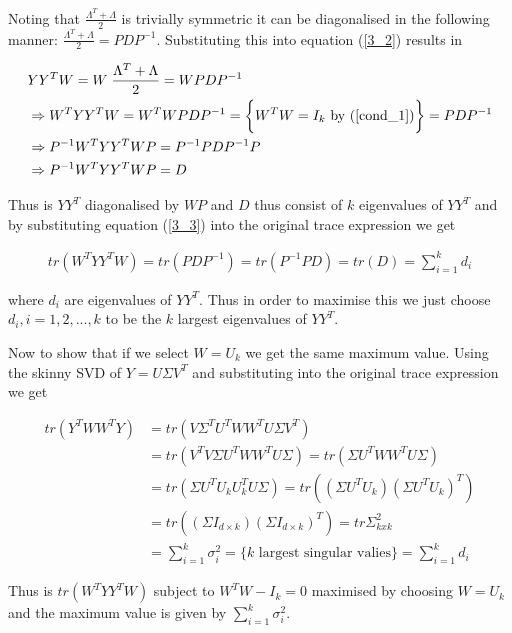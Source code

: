 Noting that $\frac{\Lambda^T + \Lambda}{2}$ is trivially symmetric it can be diagonalised in the following manner: $\frac{\Lambda^T + \Lambda}{2} = PDP^{-1}$. Substituting this into equation (\ref{3_2}) results in

\begin{align}
  & Y Y^T W = W \; \frac{\Lambda^T + \Lambda}{2} = W PDP^{-1} \\
  & \Rightarrow  W^T Y Y^T W = W^T W PDP^{-1} = \bigg\{ W^T W = I_k \text{ by } (\ref{cond_1})\bigg\} = PDP^{-1} \\
  \label{3_3}
  & \Rightarrow P^{-1} W^T Y Y^T W P = P^{-1} PDP^{-1} P \\
  & \Rightarrow P^{-1}W^T Y Y^T WP = D
\end{align}

Thus is $Y Y^T$ diagonalised by $WP$ and $D$ thus consist of $k$ eigenvalues of $Y Y^T$ and by substituting equation (\ref{3_3}) into the original trace expression we get

\begin{align}
  tr(W^T Y Y^T W) = tr(PDP^{-1}) = tr(P^{-1} P D) = tr(D) = \sum_{i=1}^k d_i
\end{align}

where $d_i$ are eigenvalues of $Y Y^T$. Thus in order to maximise this we just choose $d_i, i = 1,2,...,k$ to be the $k$ largest eigenvalues of $Y Y^T$.

Now to show that if we select $W = U_k$ we get the same maximum value. Using the skinny SVD of $Y = U \Sigma V^T$ and substituting into the original trace expression we get

\begin{align}
  tr(Y^T W W^T Y) & = tr(V \Sigma^T U^T W W^T U \Sigma V^T) \\
  & = tr(V^TV \Sigma U^T W W^T U \Sigma) = tr(\Sigma U^T W W^T U \Sigma) \\
  & = tr(\Sigma U^T U_k U_k^T U \Sigma) = tr((\Sigma U^T U_k) (\Sigma U^T U_k)^T) \\
  & = tr((\Sigma I_{d \times k}) (\Sigma I_{d \times k})^T) = tr{\Sigma_{kxk}^2} \\
  & = \sum_{i=1}^k \sigma_i^2 = \bigg\{k \text{ largest singular valies} \bigg\} = \sum_{i=1}^k d_i
\end{align}


Thus is $tr(W^T Y Y^T W)$ subject to $W^T W - I_k = 0$ maximised by choosing $W = U_k$ and the maximum value is given by $\sum_{i=1}^k \sigma_i^2$.
